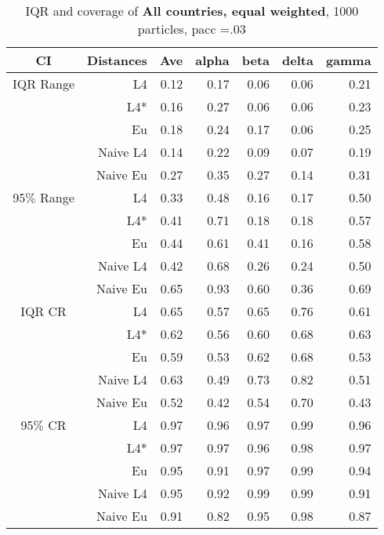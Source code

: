 \documentclass[a4paper,12pt,twoside]{book}
\begin{document}
\begin{table}[H]
\centering
\caption{IQR and coverage of \textbf{All countries, equal weighted}, 1000 particles, pacc =.03}

\begin{tabular}{crrrrrr}
  \hline
{\color{blue}CI} & Distances & Ave & alpha & beta & delta & gamma \\ 
  \hline
{\color{blue}IQR Range} & L4  &0.12 & 0.17 & 0.06 & 0.06 & 0.21 \\ 

&L4*  &  0.16 & 0.27 & 0.06 & 0.06 & 0.23 \\ 
  
&Eu &     0.18 & 0.24 & 0.17 & 0.06 & 0.25 \\ 
  
&Naive L4&  0.14 & 0.22 & 0.09 & 0.07 & 0.19 \\ 
&Naive Eu &   0.27 & 0.35 & 0.27 & 0.14 & 0.31 \\ 
  
    {\color{blue}95$\%$ Range} & L4  &0.33 & 0.48 & 0.16 & 0.17 & 0.50 \\ 
  
    &L4*  &0.41 & 0.71 & 0.18 & 0.18 & 0.57 \\ 
  
&Eu &    0.44 & 0.61 & 0.41 & 0.16 & 0.58 \\ 
  
&Naive L4&      0.42 & 0.68 & 0.26 & 0.24 & 0.50 \\ 
 
&Naive Eu &   0.65 & 0.93 & 0.60 & 0.36 & 0.69 \\ 
  
   \hline
   
{\color{blue} IQR CR } & L4  &0.65 & 0.57 & 0.65 & 0.76 & 0.61 \\ 
  

&L4*  &    0.62 & 0.56 & 0.60 & 0.68 & 0.63 \\ 
 
 
 
&Eu &      0.59 & 0.53 & 0.62 & 0.68 & 0.53 \\ 
  
  
&Naive L4& 0.63 & 0.49 & 0.73 & 0.82 & 0.51 \\
&Naive Eu &   0.52 & 0.42 & 0.54 & 0.70 & 0.43 \\ 
   
  

 {\color{blue} 95$\%$ CR }& L4  &0.97 & 0.96 & 0.97 & 0.99 & 0.96 \\ 
  
  &L4*  &   0.97 & 0.97 & 0.96 & 0.98 & 0.97 \\ 
  
 
&Eu &   0.95 & 0.91 & 0.97 & 0.99 & 0.94 \\ 
   
 
&Naive L4&    
 0.95 & 0.92 & 0.99 & 0.99 & 0.91 \\
&Naive Eu &    0.91 & 0.82 & 0.95 & 0.98 & 0.87 \\ 
  
\end{tabular}

\end{table}
\end{document}
